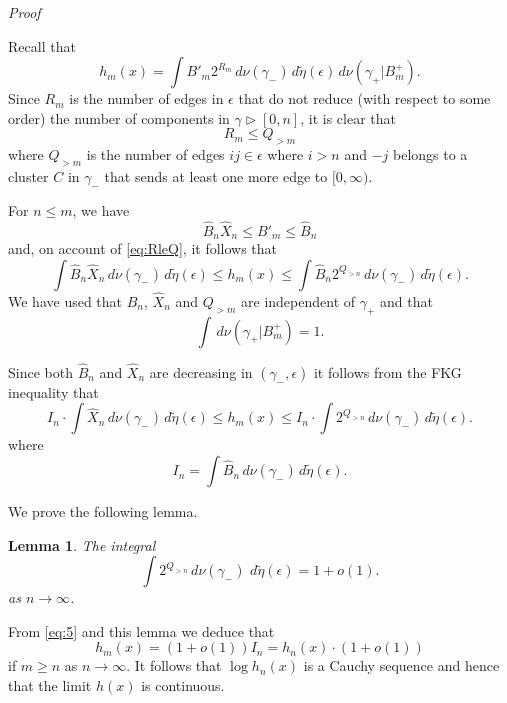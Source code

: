 \documentclass[11pt, a4paper]{amsart}
\newtheorem{lemma}[thm]{Lemma}
\theoremstyle{definition}
\theoremstyle{remark}
\renewcommand{\d}{\,d}
\providecommand{\e}{\epsilon}
\providecommand{\tl}{\tilde}
\providecommand{\g}{\gamma}
\begin{document}
\noindent
{\em Proof} \newline

\noindent
Recall that
\begin{equation}\label{eq:3}
  h_m(x) =  \int B'_m 2^{R_m} \d \nu(\g_-)\d\tl\eta(\e) \d \nu(\g_+|B_m^+).
\end{equation}
Since $R_m$ is the number of edges in $\e$ that do not reduce (with respect to
some order) the number of components in $\g\triangleright [0,n]$, it is clear
that
\begin{equation}\label{eq:RleQ}
  R_m \le Q_{>m}
\end{equation}
where \(Q_{>m}\) is the number of edges $ij\in\e$ where $i>n$ and $-j$ belongs
to a cluster $C$ in $\g_-$ that sends at least one more edge to $[0,\infty)$.

For $n\le m$, we have
$$ \hat B_n \hat X_n \le B'_m \le \hat B_n $$
and, on account of \eqref{eq:RleQ}, it follows that
\begin{equation}\label{eq:4}
  \int \hat B_n \hat X_n \d \nu(\g_-) \d\tl\eta(\e)
  \le h_m(x) \le \int \hat B_n 2^{Q_{>n}} \d\nu(\g_-) \d\tl\eta(\e).
\end{equation}
We have used that $\hat B_n$, $\hat X_n$ and $Q_{>m}$ are independent of $\g_+$ and that
$$\int\d\nu(\g_+|B_m^+)=1. $$

Since both $\hat B_n$ and $\hat X_n$ are decreasing in $(\g_-,\e)$ it follows
from the FKG inequality that
\begin{equation}
  \label{eq:5}
  I_n \cdot \int \hat X_n \d\nu(\g_-) \d\tl\eta(\e)
  \le h_m(x)
  \le I_n \cdot \int 2^{Q_{>n}} \d\nu(\g_-) \d\tl\eta(\e).
\end{equation}
where
\begin{equation}
  \label{eq:6}
  I_n = \int \hat B_n \d\nu(\g_-) \d\tl\eta(\e).
\end{equation}

We prove the following lemma.
\begin{lemma}\label{lem:qn}
  The integral
  \[
    \int 2^{Q_{>n}} \d\nu(\g_-)\, \d\tilde\eta(\e) = 1+o(1).
  \]
  as $n\to\infty$.
\end{lemma}

From \eqref{eq:5} and this lemma we deduce that
\begin{equation}
  \label{eq:2}
  h_m(x) = (1+o(1)) I_n = h_n(x) \cdot (1+o(1))
\end{equation}
if $m\ge n$ as $n\to\infty$. It follows that $\log h_n(x)$ is a Cauchy sequence
and hence that the limit $h(x)$ is continuous.
\end{document}
